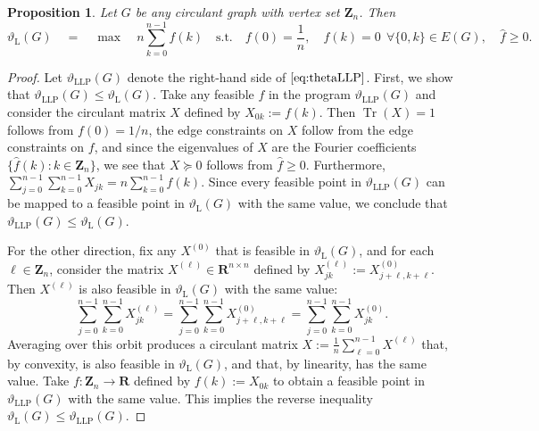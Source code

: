 \documentclass[]{spie}  %
\newtheorem{prop}[thm]{Proposition}
\begin{document}
\begin{prop}\label{prop: thetaL LP}
Let $G$ be any circulant graph with vertex set $\mathbf{Z}_n$.  Then
\begin{equation}
\label{eq:thetaLLP}
\vartheta_{\operatorname{L}}(G) 
\quad
=
\quad
\operatorname{max}
\quad
n \displaystyle \sum_{k = 0}^{n - 1} f(k)
\quad
\text{s.t.}
\quad
f(0) = \frac{1}{n},
\quad
f(k) = 0~~\forall\{0,k\}\in E(G),
\quad
\widehat{f} \geq 0.
\end{equation}
\end{prop}
\begin{proof}
Let $\vartheta_{\operatorname{LLP}}(G)$ denote the right-hand side of $\eqref{eq:thetaLLP}$.
First, we show that $\vartheta_{\operatorname{LLP}}(G)\leq\vartheta_{\operatorname{L}}(G)$.
Take any feasible $f$ in the program $\vartheta_{\operatorname{LLP}}(G)$ and consider the circulant matrix $X$ defined by $X_{0k}:=f(k)$.
Then $\operatorname{Tr}(X) = 1$ follows from $f(0) = 1/n$, the edge constraints on $X$ follow from the edge constraints on $f$, and since the eigenvalues of $X$ are the Fourier coefficients $\{\widehat{f}(k) : k \in \mathbf{Z}_n\}$, we see that $X\succeq0$ follows from $\widehat{f}\geq0$.
Furthermore, $\sum_{j = 0}^{n - 1}\sum_{k = 0}^{n - 1} X_{jk}=n\sum_{k=0}^{n-1}f(k)$.
Since every feasible point in $\vartheta_{\operatorname{LLP}}(G)$ can be mapped to a feasible point in $\vartheta_{\operatorname{L}}(G)$ with the same value, we conclude that $\vartheta_{\operatorname{LLP}}(G)\leq\vartheta_{\operatorname{L}}(G)$.

For the other direction, fix any $X^{(0)}$ that is feasible in $\vartheta_{\operatorname{L}}(G)$, and for each $\ell \in \mathbf{Z}_n$, consider the matrix $X^{(\ell)} \in \mathbf{R}^{n \times n}$ defined by $X^{(\ell)}_{jk} := X^{(0)}_{j + \ell, k + \ell}$.  Then $X^{(\ell)}$ is also feasible in $\vartheta_{\operatorname{L}}(G)$ with the same value:
\[
\sum_{j = 0}^{n - 1}\sum_{k = 0}^{n - 1} X^{(\ell)}_{jk}
=\sum_{j = 0}^{n - 1}\sum_{k = 0}^{n - 1} X^{(0)}_{j + \ell, k + \ell}
=\sum_{j = 0}^{n - 1}\sum_{k = 0}^{n - 1} X^{(0)}_{jk}.  
\]
Averaging over this orbit produces a circulant matrix $X := \frac{1}{n} \sum_{\ell = 0}^{n - 1} X^{(\ell)}$ that, by convexity, is also feasible in $\vartheta_{\operatorname{L}}(G)$, and that, by linearity, has the same value.
Take $f \colon \mathbf{Z}_n \rightarrow \mathbf{R}$ defined by $f(k) := X_{0k}$ to obtain a feasible point in $\vartheta_{\operatorname{LLP}}(G)$ with the same value.
This implies the reverse inequality $\vartheta_{\operatorname{L}}(G)\leq\vartheta_{\operatorname{LLP}}(G)$.
\end{proof}
\end{document}
